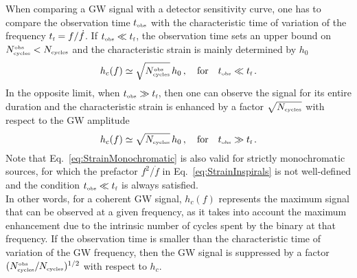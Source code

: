 \documentclass[11pt,a4paper]{article}
\begin{document}
When comparing a GW signal with a detector sensitivity curve, one has to compare the observation time $t_\text{\tiny obs}$ with the characteristic time of variation of the frequency $t_\text{\tiny f} = f/\dot{f}$. If $t_\text{\tiny obs} \ll t_\text{\tiny f}$, the observation time sets an upper bound on $N_\text{\tiny cycles}^{\text{\tiny obs}} < N_\text{\tiny cycles}$ and the characteristic strain is mainly determined by $h_0$
\begin{equation}\label{eq:StrainMonochromatic}
h_c(f) \simeq \sqrt{N_\text{\tiny cycles}^{\text{\tiny obs}}} \, h_0 \,, \quad \text{for} \quad t_\text{\tiny obs} \ll t_\text{\tiny f} \,.
\end{equation}
In the opposite limit, when $t_\text{\tiny obs} \gg t_\text{\tiny f}$, then one can observe the signal for its entire duration and the characteristic strain is enhanced by a factor $\sqrt{N_\text{\tiny cycles}}$ with respect to the GW amplitude
\begin{equation}
h_c(f) \simeq \sqrt{N_\text{\tiny cycles}} \, h_0 \,, \quad \text{for} \quad t_\text{\tiny obs} \gg t_\text{\tiny f} \,.
\end{equation}
Note that Eq.~\eqref{eq:StrainMonochromatic} is also  valid for strictly monochromatic sources, for which the prefactor $f^2/\dot{f}$ in Eq.~\eqref{eq:StrainInspirals} is not well-defined and the condition $t_\text{\tiny obs} \ll t_\text{\tiny f}$ is always satisfied.\\

In other words, for a coherent GW signal, $h_c(f)$ represents the maximum signal that can be observed at a given frequency, as it takes into account the maximum enhancement due to the intrinsic number of cycles spent by the binary at that frequency. If the observation time is smaller than the characteristic time of variation of the GW frequency, then the GW signal is suppressed by a factor $(N_\text{\tiny cycles}^\text{\tiny obs}/N_\text{\tiny cycles})^{1/2}$ with respect to $h_c$. 
\end{document}
